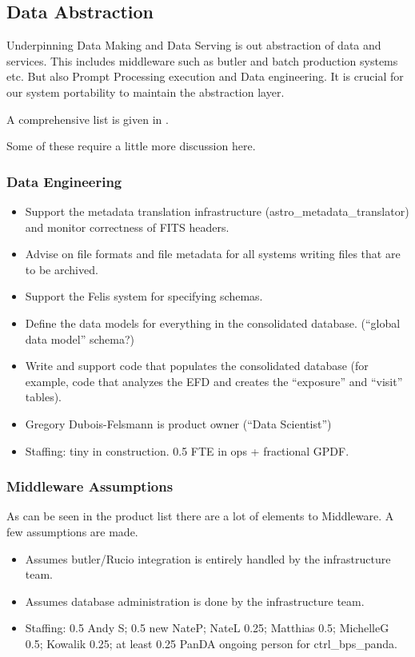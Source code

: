 \subsection{Data Abstraction } \label{sec:dataabstraction}

Underpinning Data Making and Data Serving is out abstraction of data and services.
This includes middleware such as  butler and batch production systems etc.
But also Prompt Processing execution and Data engineering.
It is crucial for our system portability to maintain the abstraction layer.

A comprehensive list is given in .

Some of these require a little more discussion here.

\subsubsection{Data Engineering}

\begin{itemize}
\item Support the metadata translation infrastructure (astro\_metadata\_translator) and monitor correctness of FITS headers.
\item Advise on file formats and file metadata for all systems writing files that are to be archived.
\item Support the Felis system for specifying schemas.
\item Define the data models for everything in the consolidated database. (“global data model” schema?)
\item Write and support code that populates the consolidated database (for example, code that analyzes the EFD and creates the “exposure” and “visit” tables).
\item Gregory Dubois-Felsmann is product owner (“Data Scientist”)
\item Staffing: tiny in construction. 0.5 FTE in ops + fractional GPDF.

\end{itemize}


\subsubsection{Middleware Assumptions}
As can be seen in the product list there are a lot of elements to Middleware.
A few assumptions are made.
\begin{itemize}
\item Assumes butler/Rucio integration is entirely handled by the infrastructure team.
\item Assumes database administration is done by the infrastructure team.
\item Staffing: 0.5 Andy S; 0.5 new NateP; NateL 0.25; Matthias 0.5; MichelleG 0.5; Kowalik 0.25; at least 0.25 PanDA ongoing person for ctrl\_bps\_panda.

\end{itemize}


